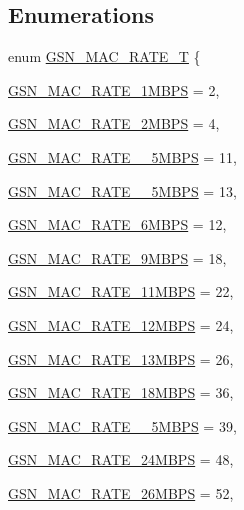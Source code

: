 \subsection*{Enumerations}
\begin{DoxyCompactItemize}
\item 
enum \hyperlink{a00642_ga260da9755b2bec5e93c8b16a5a92d41d}{GSN\_\-MAC\_\-RATE\_\-T} \{ \par
\hyperlink{a00642_gga260da9755b2bec5e93c8b16a5a92d41da8eebea2599d06d1e26e773c8878ec37c}{GSN\_\-MAC\_\-RATE\_\-1MBPS} =  2, 
\par
\hyperlink{a00642_gga260da9755b2bec5e93c8b16a5a92d41daee17221504eae789861277320adb346a}{GSN\_\-MAC\_\-RATE\_\-2MBPS} =  4, 
\par
\hyperlink{a00642_gga260da9755b2bec5e93c8b16a5a92d41daa3c3416953cd6d2d272b9a41d47cec5c}{GSN\_\-MAC\_\-RATE\_\_\-5MBPS} =  11, 
\par
\hyperlink{a00642_gga260da9755b2bec5e93c8b16a5a92d41da6ffc66c1ba4d053f582de80f67147b53}{GSN\_\-MAC\_\-RATE\_\_\-5MBPS} =  13, 
\par
\hyperlink{a00642_gga260da9755b2bec5e93c8b16a5a92d41da4ee50fb4c98be33ef617386bea1cd128}{GSN\_\-MAC\_\-RATE\_\-6MBPS} =  12, 
\par
\hyperlink{a00642_gga260da9755b2bec5e93c8b16a5a92d41da0fd352dc70a6821572a0395e4240d991}{GSN\_\-MAC\_\-RATE\_\-9MBPS} =  18, 
\par
\hyperlink{a00642_gga260da9755b2bec5e93c8b16a5a92d41daeb680a41efe94b110c0a19c7134d5892}{GSN\_\-MAC\_\-RATE\_\-11MBPS} =  22, 
\par
\hyperlink{a00642_gga260da9755b2bec5e93c8b16a5a92d41da97cdd89b6922881aab4d80c151adaf2b}{GSN\_\-MAC\_\-RATE\_\-12MBPS} =  24, 
\par
\hyperlink{a00642_gga260da9755b2bec5e93c8b16a5a92d41da8982b7bfe30b509211ddb4bfaec9f6b2}{GSN\_\-MAC\_\-RATE\_\-13MBPS} =  26, 
\par
\hyperlink{a00642_gga260da9755b2bec5e93c8b16a5a92d41da1fa98727e873a12b52fe5654f9e8beb0}{GSN\_\-MAC\_\-RATE\_\-18MBPS} =  36, 
\par
\hyperlink{a00642_gga260da9755b2bec5e93c8b16a5a92d41dad5feaa4be91659303c8e8905590004e8}{GSN\_\-MAC\_\-RATE\_\_\-5MBPS} =  39, 
\par
\hyperlink{a00642_gga260da9755b2bec5e93c8b16a5a92d41dad28f25101ea2432bdd1a06fe2a97fc14}{GSN\_\-MAC\_\-RATE\_\-24MBPS} =  48, 
\par
\hyperlink{a00642_gga260da9755b2bec5e93c8b16a5a92d41dad012ef0af6775a233e4fefa0b163dd2c}{GSN\_\-MAC\_\-RATE\_\-26MBPS} =  52, 

\end{DoxyCompactItemize}
